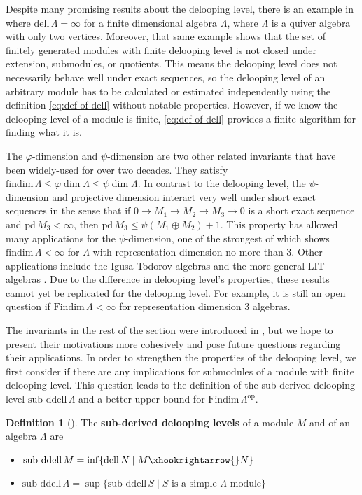 \documentclass{conm-p-l}
\renewcommand{\phi}{\varphi}
\newcommand{\findim}{\mathrm{findim}\,}
\newcommand{\Findim}{\mathrm{Findim}\,}
\newcommand{\dell}{\mathrm{dell}\,}
\newcommand{\phidim}{\varphi\dim}
\newcommand{\psidim}{\psi\dim}
\renewcommand{\dell}{\mathrm{dell}\,}
\newcommand{\pd}{\mathrm{pd}\,}
\newcommand{\op}{\mathrm{op}}
\newcommand{\into}{\xhookrightarrow{}}
\newcommand{\subddell}{\mathrm{sub}\text{-}\mathrm{ddell}\,}
\theoremstyle{definition}
\newtheorem{definition}[theorem]{Definition}
\theoremstyle{remark}
\numberwithin{equation}{section}
\begin{document}
Despite many promising results about the delooping level, there is an example in \cite{kershaw2023} where $\dell\Lambda=\infty$ for a finite dimensional algebra $\Lambda$, where $\Lambda$ is a quiver algebra with only two vertices. Moreover, that same example shows that the set of finitely generated modules with finite delooping level is not closed under extension, submodules, or quotients. This means the delooping level does not necessarily behave well under exact sequences, so the delooping level of an arbitrary module has to be calculated or estimated independently using the definition \eqref{eq:def of dell} without notable properties. However, if we know the delooping level of a module is finite, \eqref{eq:def of dell} provides a finite algorithm for finding what it is.

The $\phi$-dimension and $\psi$-dimension \cite{igusa2005} are two other related invariants that have been widely-used for over two decades. They satisfy $\findim\Lambda\leq\phidim\Lambda\leq\psidim\Lambda$.  In contrast to the delooping level, the $\psi$-dimension and projective dimension interact very well under short exact sequences in the sense that if $0\to M_1 \to M_2 \to M_3\to 0$ is a short exact sequence and $\pd M_3<\infty$, then $\pd M_3\leq \psi(M_1\oplus M_2) + 1$. This property has allowed many applications for the $\psi$-dimension, one of the strongest of which shows $\findim\Lambda<\infty$ for $\Lambda$ with representation dimension no more than 3. Other applications include the Igusa-Todorov algebras \cite{wei2009finitistic} and the more general LIT algebras \cite{bravo2021generalised}. Due to the difference in delooping level's properties, these results cannot yet be replicated for the delooping level. For example, it is still an open question if $\Findim\Lambda<\infty$ for representation dimension 3 algebras.

The invariants in the rest of the section were introduced in \cite{guo2025derived}, but we hope to present their motivations more cohesively and pose future questions regarding their applications. In order to strengthen the properties of the delooping level, we first consider if there are any implications for submodules of a module with finite delooping level. This question leads to the definition of the sub-derived delooping level $\subddell\Lambda$ and a better upper bound for $\Findim\Lambda^{\op}$.

\begin{definition}[\cite{guo2025derived}]
\label{def:subddell}
The \textbf{sub-derived delooping levels} of a module $M$ and of an algebra $\Lambda$ are
\begin{itemize}
\item $\subddell M = \inf\{\dell N \mid M\into N\}$
\item $\subddell \Lambda = \sup\{\subddell S \mid S \text{ is a simple $\Lambda$-module} \}$
\end{itemize}
\end{definition}
\end{document}
